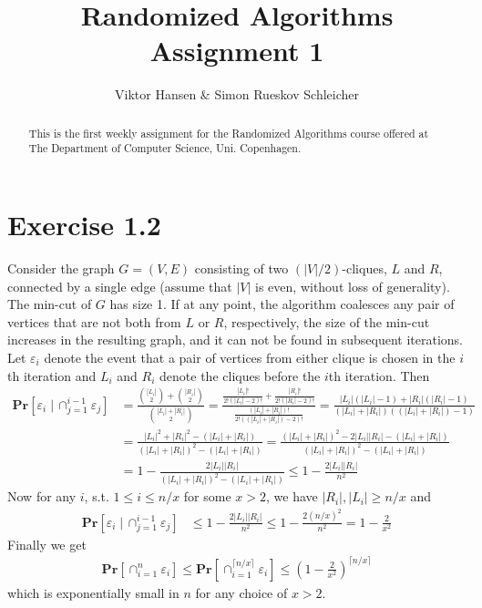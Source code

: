 \documentclass[12pt]{article}
\begin{document}
\nocite{*}


\title{Randomized Algorithms \\
       Assignment 1}

\author{Viktor Hansen \& Simon Rueskov Schleicher}

\maketitle

\begin{abstract}
  This is the first weekly assignment for the Randomized Algorithms course offered at The Department of Computer Science, Uni. Copenhagen.
\end{abstract}

\pagebreak

\section*{Exercise 1.2}
Consider the graph $G=(V,E)$ consisting of two $(\left|V\right|/2)$-cliques, $L$ and $R$, connected by a single edge (assume that $|V|$ is even, without loss of generality). The min-cut of $G$ has size 1. If at any point, the algorithm coalesces any pair of vertices that are not both from $L$ or $R$, respectively, the size of the min-cut increases in the resulting graph, and it can not be found in subsequent iterations. Let $\varepsilon_i$ denote the event that a pair of vertices from either clique is chosen in the $i$th iteration and $L_{i}$ and $R_{i}$ denote the cliques before the $i$th iteration. Then 
\begin{align*}
\mathbf{Pr}\left[ \varepsilon_i \; | \, \cap_{j=1}^{i-1} \varepsilon_j \right] &= \frac{\binom{|L_i|}{2} + \binom{|R_i|}{2}}{\binom{|L_i|+|R_i|}{2}}
= \frac{\frac{|L_i|!}{2!(|L_i|-2)!} + \frac{|R_i|!}{2!(|R_i|-2)!}}{\frac{(|L_i|+|R_i|)!}{2!((|L_i|+|R_i|)-2)!}}
= \frac{|L_i|(|L_i|-1) + |R_i|(|R_i|-1)}{(|L_i|+|R_i|)((|L_i|+|R_i|)-1)} \\
&= \frac{|L_i|^2+ |R_i|^2 - (|L_i| +|R_i|)}{(|L_i|+|R_i|)^2-(|L_i|+|R_i|)}
= \frac{(|L_i| + |R_i|)^2 - 2|L_i||R_i| - (|L_i| +|R_i|)}{(|L_i|+|R_i|)^2-(|L_i|+|R_i|)} \\
&= 1 - \frac{2|L_i||R_i|}{(|L_i|+|R_i|)^2-(|L_i|+|R_i|)} \leq 1 -  \frac{2|L_i||R_i|}{n^2}
\end{align*}
Now for any $i$, s.t. $1 \leq i \leq n/x$ for some $x > 2$, we have $|R_i|,|L_i| \geq n/x$ and
\begin{align*}
\mathbf{Pr}\left[ \varepsilon_i \; | \, \cap_{j=1}^{i-1} \varepsilon_j \right] &\leq 1 - \frac{2|L_i||R_i|}{n^2} \leq 1 - \frac{2(n/x)^2}{n^2} = 1 - \frac{2}{x^2}
\end{align*}
Finally we get
\begin{align*}
\mathbf{Pr}\left[ \cap_{i=1}^{n} \varepsilon_i \right] \leq \mathbf{Pr}\left[ \cap_{i=1}^{\lceil n/x \rceil} \varepsilon_i \right] \leq \left( 1 - \frac{2}{x^2} \right)^{\lceil n/x \rceil}
\end{align*}
which is exponentially small in $n$ for any choice of $x > 2$.
\end{document}

